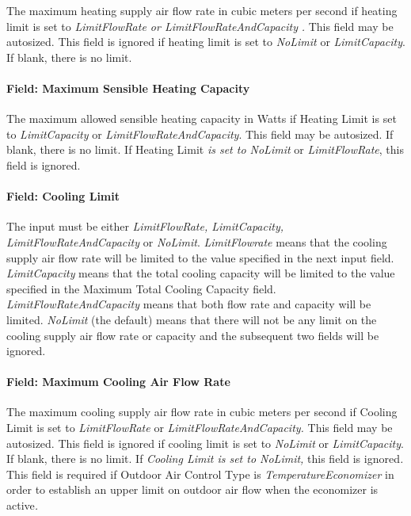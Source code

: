 The maximum heating supply air flow rate in cubic meters per second if heating limit is set to \emph{LimitFlowRate or LimitFlowRateAndCapacity} \emph{.} This field may be autosized. This field is ignored if heating limit is set to \emph{NoLimit} or \emph{LimitCapacity}. If blank, there is no limit.

\paragraph{Field: Maximum Sensible Heating Capacity}\label{field-maximum-sensible-heating-capacity}

The maximum allowed sensible heating capacity in Watts if Heating Limit is set to \emph{LimitCapacity} or \emph{LimitFlowRateAndCapacity}. This field may be autosized. If blank, there is no limit. If Heating Limit \emph{is set to NoLimit} or \emph{LimitFlowRate}, this field is ignored.

\paragraph{Field: Cooling Limit}\label{field-cooling-limit}

The input must be either \emph{LimitFlowRate, LimitCapacity, LimitFlowRateAndCapacity} or \emph{NoLimit}. \emph{LimitFlowrate} means that the cooling supply air flow rate will be limited to the value specified in the next input field. \emph{LimitCapacity} means that the total cooling capacity will be limited to the value specified in the Maximum Total Cooling Capacity field. \emph{LimitFlowRateAndCapacity} means that both flow rate and capacity will be limited. \emph{NoLimit} (the default) means that there will not be any limit on the cooling supply air flow rate or capacity and the subsequent two fields will be ignored.

\paragraph{Field: Maximum Cooling Air Flow Rate}\label{field-maximum-cooling-air-flow-rate-000}

The maximum cooling supply air flow rate in cubic meters per second if Cooling Limit is set to \emph{LimitFlowRate} or \emph{LimitFlowRateAndCapacity.} This field may be autosized. This field is ignored if cooling limit is set to \emph{NoLimit} or \emph{LimitCapacity}. If blank, there is no limit. If \emph{Cooling Limit is set to NoLimit,} this field is ignored\emph{.} This field is required if Outdoor Air Control Type is \emph{TemperatureEconomizer} in order to establish an upper limit on outdoor air flow when the economizer is active\emph{.}

